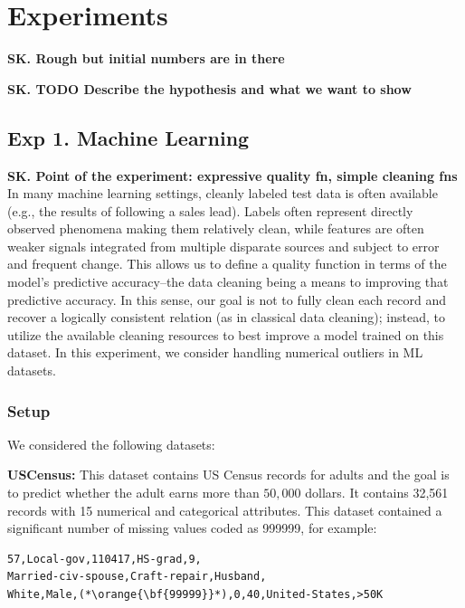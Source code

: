 \section{Experiments}\label{s:exp}
\textbf{SK. Rough but initial numbers are in there}

\textbf{SK. TODO Describe the hypothesis and what we want to show}

\subsection*{Exp 1. Machine Learning}
\textbf{SK. Point of the experiment: expressive quality fn, simple cleaning fns}
In many machine learning settings, cleanly labeled test data is often available (e.g., the results of following a sales lead). 
Labels often represent directly observed phenomena making them relatively clean, while features are often weaker signals integrated from multiple disparate sources and subject to error and frequent change.
This allows us to define a quality function in terms of the model's predictive accuracy--the data cleaning being a means to improving that predictive accuracy.
In this sense, our goal is not to fully clean each record and recover a logically consistent relation (as in classical data cleaning); instead, to utilize the available cleaning resources to best improve a model trained on this dataset. In this experiment, we consider handling numerical outliers in ML datasets.

\subsubsection{Setup}
We considered the following datasets:

\vspace{0.5em}\noindent\textbf{USCensus: } This dataset contains US Census records for adults and the goal is to predict  whether the adult earns more than $50,000$ dollars. It contains 32,561 records with 15 numerical and categorical attributes. This dataset contained a significant number of missing values coded as 999999, for example:
\begin{lstlisting}
57,Local-gov,110417,HS-grad,9,
Married-civ-spouse,Craft-repair,Husband,
White,Male,(*\orange{\bf{99999}}*),0,40,United-States,>50K
\end{lstlisting}

